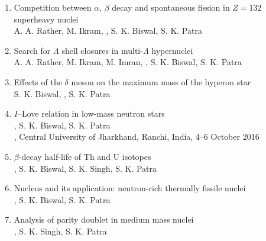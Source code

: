 \begin{enumerate}
\item Competition between $\alpha$, $\beta$ decay and spontaneous fission in
$Z=132$ superheavy nuclei\\
A. A. Rather, M. Ikram, \me, S. K. Biswal, S. K. Patra\\

\item Search for $\Lambda$ shell closures in multi-$\Lambda$ hypernuclei\\
A. A. Rather, M. Ikram, M. Imran, \me, S. K. Biswal, S. K. Patra\\

\item Effects of the $\delta$ meson on the maximum mass of the hyperon star\\
S. K. Biswal, \me, S. K. Patra\\

\item \lead $I$--Love relation in low-mass neutron stars\\
\me, S. K. Biswal, S. K. Patra\\
, Central University of Jharkhand, Ranchi, India,
4--6 October 2016

\item \lead $\beta$-decay half-life of Th and U isotopes\\
\me, S. K. Biswal, S. K. Singh, S. K. Patra\\

\item \lead Nucleus and its application: neutron-rich thermally fissile nuclei\\
\me, S. K. Biswal, S. K. Patra\\

\item \lead Analysis of parity doublet in medium mass nuclei\\
\me, S. K. Singh, S. K. Patra\\

\end{enumerate}
